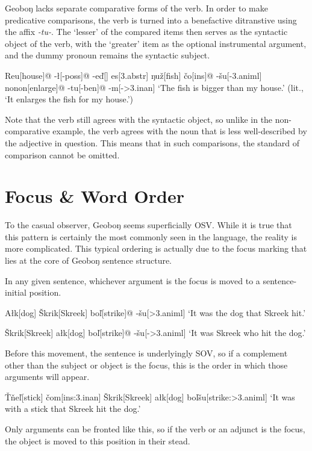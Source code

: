 \documentclass[a4paper,11pt,oneside,openany]{memoir}
\newcommand{\vd}{ď}
\newcommand{\vc}{č}
\newcommand{\vz}{ž}
\newcommand{\vs}{š}
\newcommand{\vl}{ľ}
\newcommand{\vn}{ň}
\newcommand{\vT}{Ť}
\newcommand{\vS}{Š}
\newcommand{\engma}{ŋ}
\begin{document}
Geobo{\engma} lacks separate comparative forms of the verb. In order to make predicative comparisons, the verb is turned into a benefactive ditranstive using the affix \textit{-tu-}. The `lesser' of the compared items then serves as the syntactic object of the verb, with the `greater' item as the optional instrumental argument, and the dummy pronoun remains the syntactic subject.

\ex 
\begingl
Reu[house]@
-\l[\sc -poss]@
-e\vd[]
es[\sc 3.abstr]
\engma u\vz[fish] 
\vc o[\sc ins]@
-\vs u[\sc -3.animl]
nonon[enlarge]@
-tu[\sc -ben]@
-m[\sc ->3.inan]
\glft `The fish is bigger than my house.' (lit., `It enlarges the fish for my house.')
\endgl
\xe

Note that the verb still agrees with the syntactic object, so unlike in the non-comparative example, the verb agrees with the noun that is less well-described by the adjective in question. This means that in such comparisons, the standard of comparison cannot be omitted.

\section{Focus \& Word Order}\label{focus}

To the casual observer, Geobo{\engma} seems superficially OSV. While it is true that this pattern is certainly the most commonly seen in the language, the reality is more complicated. This typical ordering is actually due to the focus marking that lies at the core of Geobo{\engma} sentence structure.

In any given sentence, whichever argument is the focus is moved to a sentence-initial position. 

\ex
\begingl
A\l k[dog]
\vS krik[Skreek]
bo\vl[strike]@
-\vs u[{\sc >3.animl}]
\glft `It was the dog that Skreek hit.'
\endgl
\xe

\ex
\begingl
\vS krik[Skreek]
a\l k[dog]
bo\vl[strike]@
-\vs u[-{\sc >3.animl}]
\glft `It was Skreek who hit the dog.'
\endgl
\xe

Before this movement, the sentence is underlyingly SOV, so if a complement other than the subject or object is the focus, this is the order in which those arguments will appear.

\ex
\begingl
\vT\vn e{\vl}[stick]
\vc om[\sc ins:3.inan]
\vS krik[Skreek]
a\l k[dog]
bo\vl\vs u[strike:{\sc >3.animl}]
\glft `It was with a stick that Skreek hit the dog.'
\endgl
\xe

Only arguments can be fronted like this, so if the verb or an adjunct is the focus, the object is moved to this position in their stead. 
\end{document}

